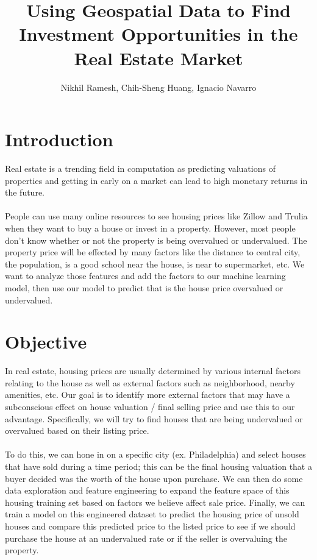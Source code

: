 \documentclass{article}
\title{\vspace{-4cm}Using Geospatial Data to Find Investment Opportunities in the Real Estate Market}
\author{Nikhil Ramesh, Chih-Sheng Huang, Ignacio Navarro}
\begin{document}
\maketitle

\section{Introduction}
Real estate is a trending field in computation as predicting valuations of properties and getting in early on a market can lead to high monetary returns in the future. \\ \\
People can use many online resources to see housing prices like Zillow and Trulia when they want to buy a house or invest in a property. However, most people don't know whether or not the property is being overvalued or undervalued. The property price will be effected by many factors like the distance to central city, the population, is a good school near the house, is near to supermarket, etc. We want to analyze those features and add the factors to  our machine learning model, then use our model to predict that is the house price overvalued or undervalued.


\section{Objective}

In real estate, housing prices are usually determined by various internal factors relating to the house as well as external factors such as neighborhood, nearby amenities, etc. Our goal is to identify more external factors that may have a subconscious effect on house valuation / final selling price and use this to our advantage. Specifically, we will try to find houses that are being undervalued or overvalued based on their listing price. \\ \\
To do this, we can hone in on a specific city (ex. Philadelphia) and select houses that have sold during a time period; this can be the final housing valuation that a buyer decided was the worth of the house upon purchase. We can then do some data exploration and feature engineering to expand the feature space of this housing training set based on factors we believe affect sale price. Finally, we can train a model on this engineered dataset to predict the housing price of unsold houses and compare this predicted price to the listed price to see if we should purchase the house at an undervalued rate or if the seller is overvaluing the property.
\end{document}
